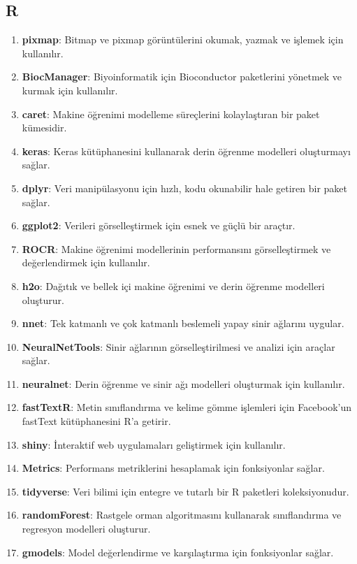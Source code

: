 \newpage

\subsection{R}
\begin{enumerate}
    \item \textbf{pixmap}: Bitmap ve pixmap görüntülerini okumak, yazmak ve işlemek için kullanılır.
    \item \textbf{BiocManager}: Biyoinformatik için Bioconductor paketlerini yönetmek ve kurmak için kullanılır.
    \item \textbf{caret}: Makine öğrenimi modelleme süreçlerini kolaylaştıran bir paket kümesidir.
    \item \textbf{keras}: Keras kütüphanesini kullanarak derin öğrenme modelleri oluşturmayı sağlar.
    \item \textbf{dplyr}: Veri manipülasyonu için hızlı, kodu okunabilir hale getiren bir paket sağlar.
    \item \textbf{ggplot2}: Verileri görselleştirmek için esnek ve güçlü bir araçtır.
    \item \textbf{ROCR}: Makine öğrenimi modellerinin performansını görselleştirmek ve değerlendirmek için kullanılır.
    \item \textbf{h2o}: Dağıtık ve bellek içi makine öğrenimi ve derin öğrenme modelleri oluşturur.
    \item \textbf{nnet}: Tek katmanlı ve çok katmanlı beslemeli yapay sinir ağlarını uygular.
    \item \textbf{NeuralNetTools}: Sinir ağlarının görselleştirilmesi ve analizi için araçlar sağlar.
    \item \textbf{neuralnet}: Derin öğrenme ve sinir ağı modelleri oluşturmak için kullanılır.
    \item \textbf{fastTextR}: Metin sınıflandırma ve kelime gömme işlemleri için Facebook'un fastText kütüphanesini R'a getirir.
    \item \textbf{shiny}: İnteraktif web uygulamaları geliştirmek için kullanılır.
    \item \textbf{Metrics}: Performans metriklerini hesaplamak için fonksiyonlar sağlar.
    \item \textbf{tidyverse}: Veri bilimi için entegre ve tutarlı bir R paketleri koleksiyonudur.
    \item \textbf{randomForest}: Rastgele orman algoritmasını kullanarak sınıflandırma ve regresyon modelleri oluşturur.
    \item \textbf{gmodels}: Model değerlendirme ve karşılaştırma için fonksiyonlar sağlar.

\end{enumerate}
